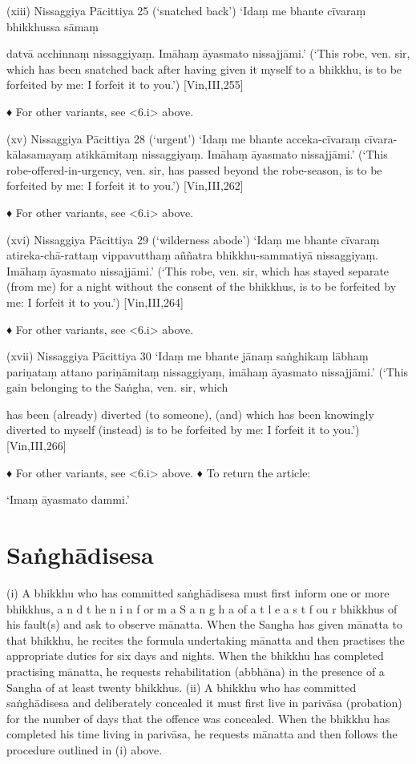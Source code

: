 (xiii) Nissaggiya Pācittiya 25 (‘snatched back’)
‘Idaṃ me bhante cīvaraṃ bhikkhussa sāmaṃ

datvā acchinnaṃ nissaggiyaṃ.
Imāhaṃ āyasmato nissajjāmi.’
(‘This robe, ven. sir, which has been snatched back
after having given it myself to a bhikkhu, is to be
forfeited by me: I forfeit it to you.’) [Vin,III,255]

♦ For other variants, see <6.i> above.

(xv) Nissaggiya Pācittiya 28 (‘urgent’)
‘Idaṃ me bhante acceka-cīvaraṃ cīvara-kālasamayaṃ atikkāmitaṃ nissaggiyaṃ.
Imāhaṃ āyasmato nissajjāmi.’
(‘This robe-offered-in-urgency, ven. sir, has passed
beyond the robe-season, is to be forfeited by me: I
forfeit it to you.’)
[Vin,III,262]

♦ For other variants, see <6.i> above.

(xvi) Nissaggiya Pācittiya 29 (‘wilderness abode’)
‘Idaṃ me bhante cīvaraṃ atireka-chā-rattaṃ
vippavutthaṃ aññatra bhikkhu-sammatiyā
nissaggiyaṃ. Imāhaṃ āyasmato nissajjāmi.’
(‘This robe, ven. sir, which has stayed separate (from
me) for a night without the consent of the bhikkhus,
is to be forfeited by me: I forfeit it to you.’) [Vin,III,264]

♦ For other variants, see <6.i> above.

(xvii) Nissaggiya Pācittiya 30
‘Idaṃ me bhante jānaṃ saṅghikaṃ lābhaṃ
pariṇataṃ attano pariṇāmitaṃ nissaggiyaṃ,
imāhaṃ āyasmato nissajjāmi.’
(‘This gain belonging to the Saṅgha, ven. sir, which

has been (already) diverted (to someone), (and)
which has been knowingly diverted to myself
(instead) is to be forfeited by me: I forfeit it to you.’)
[Vin,III,266]

♦ For other variants, see <6.i> above.
♦ To return the article:

‘Imaṃ āyasmato dammi.’

\section{Saṅghādisesa}

(i) A bhikkhu who has committed saṅghādisesa must first inform one or more bhikkhus,
a n d t he n i n f or m a S a n g h a of a t l e a s t f ou r
bhikkhus of his fault(s) and ask to observe
mānatta. When the Sangha has given mānatta
to that bhikkhu, he recites the formula undertaking mānatta and then practises the
appropriate duties for six days and nights.
When the bhikkhu has completed practising
mānatta, he requests rehabilitation (abbhāna)
in the presence of a Sangha of at least twenty
bhikkhus.
(ii) A bhikkhu who has committed saṅghādisesa and deliberately concealed it must first
live in parivāsa (probation) for the number of
days that the offence was concealed. When
the bhikkhu has completed his time living in
parivāsa, he requests mānatta and then follows the procedure outlined in (i) above.

